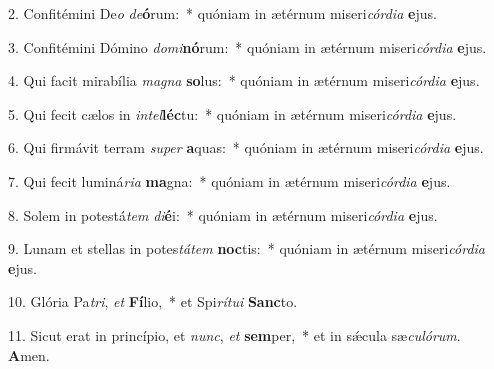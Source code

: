 2. Confitémini De\textit{o} \textit{de}\textbf{ó}rum:~*  quóniam in ætérnum miseri\textit{cór}\textit{di}\textit{a} \textbf{e}jus.\

3. Confitémini Dómino \textit{do}\textit{mi}\textbf{nó}rum:~*  quóniam in ætérnum miseri\textit{cór}\textit{di}\textit{a} \textbf{e}jus.\

4. Qui facit mirabília \textit{ma}\textit{gna} \textbf{so}lus:~*  quóniam in ætérnum miseri\textit{cór}\textit{di}\textit{a} \textbf{e}jus.\

5. Qui fecit cælos in \textit{in}\textit{tel}\textbf{léc}tu:~*  quóniam in ætérnum miseri\textit{cór}\textit{di}\textit{a} \textbf{e}jus.\

6. Qui firmávit terram \textit{su}\textit{per} \textbf{a}quas:~*  quóniam in ætérnum miseri\textit{cór}\textit{di}\textit{a} \textbf{e}jus.\

7. Qui fecit luminá\textit{ri}\textit{a} \textbf{ma}gna:~*  quóniam in ætérnum miseri\textit{cór}\textit{di}\textit{a} \textbf{e}jus.\

8. Solem in potestá\textit{tem} \textit{di}\textbf{é}i:~*  quóniam in ætérnum miseri\textit{cór}\textit{di}\textit{a} \textbf{e}jus.\

9. Lunam et stellas in potes\textit{tá}\textit{tem} \textbf{noc}tis:~*  quóniam in ætérnum miseri\textit{cór}\textit{di}\textit{a} \textbf{e}jus.\

10. Glória Pa\textit{tri}, \textit{et} \textbf{Fí}lio,~*  et Spi\textit{rí}\textit{tu}\textit{i} \textbf{Sanc}to.\

11. Sicut erat in princípio, et \textit{nunc}, \textit{et} \textbf{sem}per,~*  et in sǽcula sæ\textit{cu}\textit{ló}\textit{rum}. \textbf{A}men.\

